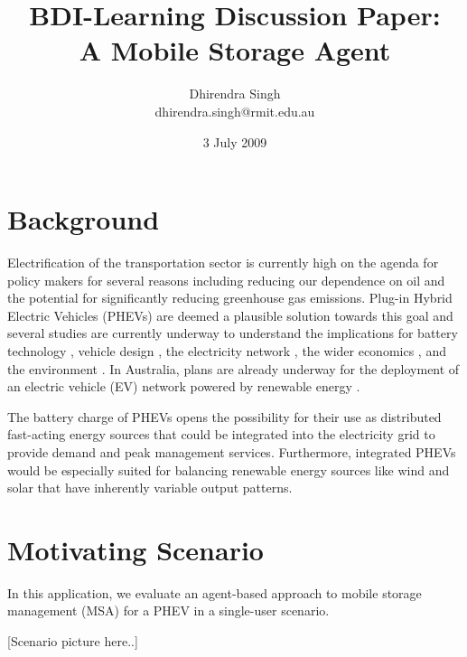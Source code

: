 \documentclass[a4paper]{article}
\title{BDI-Learning Discussion Paper:\\ A Mobile Storage Agent}
\author{
Dhirendra Singh\\ 
dhirendra.singh@rmit.edu.au\\
}
\begin{document}
\date{3 July 2009}

\maketitle

\section{Background}

Electrification of the transportation sector is currently high on the agenda for policy makers for several reasons including reducing our dependence on oil and the potential for significantly reducing greenhouse gas emissions. Plug-in Hybrid Electric Vehicles (PHEVs) are deemed a plausible solution towards this goal and several studies are currently underway to understand the implications for battery technology \cite{burke2007batte}, vehicle design \cite{bradley2009desig}, the electricity network \cite{lund2008integ}, the wider economics \cite{wellinghoff2009the-c}, and the environment \cite{samaras2008life-}. In Australia, plans are already underway for the deployment of an electric vehicle (EV) network powered by renewable energy \cite{release2008bette}. 

The battery charge of PHEVs opens the possibility for their use as distributed fast-acting energy sources that could be integrated into the electricity grid to provide demand and peak management services. Furthermore, integrated PHEVs would be especially suited for balancing renewable energy sources like wind and solar that have inherently variable output patterns.

\section{Motivating Scenario}

In this application, we evaluate an agent-based approach to mobile storage management (MSA) for a PHEV in a single-user scenario.


[Scenario picture here..]
\end{document}
